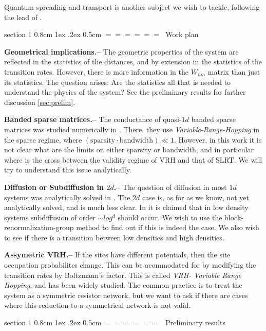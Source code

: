 \documentclass[onecolumn,fleqn,notitlepage,secnumarabic]{revtex4}
\makeatletter
\def\section{%
  \@startsection
    {section}%
    {1}%
    {\z@}%
    {0.8cm \@plus1ex \@minus .2ex}%
    {0.5cm}%
    {\Large\bf $=\!=\!=\!=\!=\!=\;$}%
}%
\makeatother
\begin{document}
Quantum spreading and transport is another subject we wish to tackle, following the lead of \cite{Jayannavar:1991}\cite{Guarneri:1989}\cite{Guarneri:1993}.


\section{Work plan}


{ \bf Geometrical implications.-- } The geometric properties of the system are reflected in the statistics of the distances, and by extension in the statistics of the transition rates. However, there is more information in the $W_{nm}$ matrix than just its statistics. The question arises: Are the statistics all that is needed to understand the physics of the system? See the preliminary results for farther discussion \ref{sec:prelim}.

{ \bf Banded sparse matrices.-- } The conductance of quasi-$1d$ banded sparse matrices was studied numerically in \cite{Stotland:2010:PRB}. There, they use \emph{Variable-Range-Hopping} in the sparse regime, where 
$(\text{sparsity}\cdot \text{bandwidth}) \ll 1$. However, in this work it is not clear what are the limits on either sparsity or bandwidth, and in particular where is the cross between the validity regime of VRH and that of SLRT. We will try to understand this issue analytically.

{ \bf Diffusion or Subdiffusion in $2d$.-- } The question of diffusion in most $1d$ systems was analytically solved in \cite{Alexander:1981:RMP}. The $2d$ case is, as for as we know, not yet analytically solved, and is much less clear. In \cite{Amir:2010:PRL} it is claimed that in low density systems subdiffusion of order $\sim log^d$ should occur. We wish to use the block-renormalization-group method to find out if this is indeed the case. We also wish to see if there is a transition between low densities and high densities.

{\bf Assymetric VRH.--} If the sites have different potentials, then the site occupation probabilites change. This can be acommodated for by modifying the transition rates by Boltzmann's factor. This is called \emph{VRH- Variable Range Hopping}\cite{Ambegaokar:1971}, and has been widely studied. The common practice is to treat the system as a symmetric resistor network, but we want to ask if there are cases where this reduction to a symmetrical network is not valid.

\section{Preliminary results} \label{sec:prelim}
\end{document}

